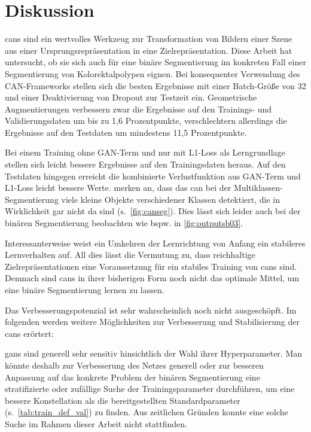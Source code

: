 \chapter{Diskussion}

\glspl{can} sind ein wertvolles Werkzeug zur Transformation von Bildern einer Szene aus einer Ursprungsrepräsentation in eine Zielrepräsentation.
Diese Arbeit hat untersucht, ob sie sich auch für eine binäre Segmentierung im konkreten Fall einer Segmentierung von Kolorektalpolypen eignen.
Bei konsequenter Verwendung des CAN-Frameworks stellen sich die besten Ergebnisse mit einer Batch-Größe von 32 und einer Deaktivierung von Dropout zur Testzeit ein.
Geometrische Augmentierungen verbessern zwar die Ergebnisse auf den Trainings- und Validierungsdaten um bis zu 1,6 Prozentpunkte, verschlechtern allerdings die Ergebnisse auf den Testdaten um mindestens 11,5 Prozentpunkte.

Bei einem Training ohne GAN-Term und nur mit L1-Loss als Lerngrundlage stellen sich leicht bessere Ergebnisse auf den Trainingsdaten heraus.
Auf den Testdaten hingegen erreicht die kombinierte Verlustfunktion aus GAN-Term und L1-Loss leicht bessere Werte.
\citeauthor{Isola.2017} merken an, dass das \gls{can} bei der Multiklassen-Segmentierung viele kleine Objekte verschiedener Klassen detektiert, die in Wirklichkeit gar nicht da sind (s.~\autoref{fig:canseg}).
Dies lässt sich leider auch bei der binären Segmentierung beobachten wie bspw. in \autoref{fig:outputsb03}.

Interessanterweise weist ein Umkehren der Lernrichtung von Anfang ein stabileres Lernverhalten auf.
All dies lässt die Vermutung zu, dass reichhaltige Zielrepräsentationen eine Voraussetzung für ein stabiles Training von \glspl{can} sind.
Demnach sind \glspl{can} in ihrer bisherigen Form noch nicht das optimale Mittel, um eine binäre Segmentierung lernen zu lassen.

Das Verbesserungspotenzial ist sehr wahrscheinlich noch nicht ausgeschöpft.
Im folgenden werden weitere Möglichkeiten zur Verbesserung und Stabilisierung der \glspl{can} erörtert:

\glspl{gan} sind generell sehr sensitiv hinsichtlich der Wahl ihrer Hyperparameter.
Man könnte deshalb zur Verbesserung des Netzes generell oder zur besseren Anpassung auf das konkrete Problem der binären Segmentierung eine stratifizierte oder zufällige Suche der Trainingsparameter durchführen, um eine bessere Konstellation als die bereitgestellten Standardparameter (s.~\autoref{tab:train_def_val}) zu finden.
Aus zeitlichen Gründen konnte eine solche Suche im Rahmen dieser Arbeit nicht stattfinden.



